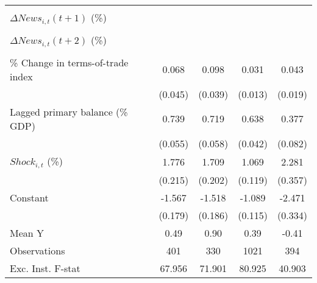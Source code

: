 {\begin{tabular}{l*{4}{c}}
                    &                     &                     &                     &                     \\
\addlinespace
$ \Delta News_{i,t}(t+1)$ (\%)&                     &                     &                     &                     \\
                    &                     &                     &                     &                     \\
\addlinespace
$ \Delta News_{i,t}(t+2)$ (\%)&                     &                     &                     &                     \\
                    &                     &                     &                     &                     \\
\addlinespace
\% Change in terms-of-trade index&       0.068         &       0.098\sym{**} &       0.031\sym{**} &       0.043\sym{**} \\
                    &     (0.045)         &     (0.039)         &     (0.013)         &     (0.019)         \\
\addlinespace
Lagged primary balance (\% GDP)&       0.739\sym{***}&       0.719\sym{***}&       0.638\sym{***}&       0.377\sym{***}\\
                    &     (0.055)         &     (0.058)         &     (0.042)         &     (0.082)         \\
\addlinespace
$ Shock_{i,t}$ (\%) &       1.776\sym{***}&       1.709\sym{***}&       1.069\sym{***}&       2.281\sym{***}\\
                    &     (0.215)         &     (0.202)         &     (0.119)         &     (0.357)         \\
\addlinespace
Constant            &      -1.567\sym{***}&      -1.518\sym{***}&      -1.089\sym{***}&      -2.471\sym{***}\\
                    &     (0.179)         &     (0.186)         &     (0.115)         &     (0.334)         \\
\midrule
Mean Y              &        0.49         &        0.90         &        0.39         &       -0.41         \\
Observations        &         401         &         330         &        1021         &         394         \\
Exc. Inst. F-stat   &      67.956         &      71.901         &      80.925         &      40.903         \\
\bottomrule
\end{tabular}
}
